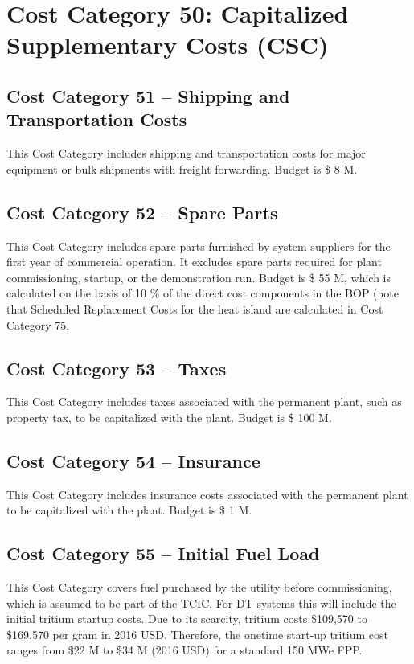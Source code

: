 \section{Cost Category 50: Capitalized Supplementary Costs (CSC)}


\subsection*{Cost Category 51 – Shipping and Transportation Costs}
This Cost Category includes shipping and transportation costs for major equipment or bulk shipments with freight forwarding. Budget is \$ 8 M.

\subsection*{Cost Category 52 – Spare Parts}
This Cost Category includes spare parts furnished by system suppliers for the first year of commercial operation. It excludes spare parts required for plant commissioning, startup, or the demonstration run.  Budget is \$ 55 M, which is calculated on the basis of 10 \% of the direct cost components in the BOP (note that Scheduled Replacement Costs for the heat island are calculated in Cost Category 75.

\subsection*{Cost Category 53 – Taxes}
This Cost Category includes taxes associated with the permanent plant, such as property tax, to be capitalized with the plant. Budget is \$ 100 M.

\subsection*{Cost Category 54 – Insurance}
This Cost Category includes insurance costs associated with the permanent plant to be capitalized with the plant.  Budget is \$ 1 M.

\subsection*{Cost Category 55 – Initial Fuel Load}
This Cost Category covers fuel purchased by the utility before commissioning, which is assumed to be part of the TCIC. For DT systems this will include the initial tritium startup costs.  Due to its scarcity, tritium costs \$109,570 to \$169,570 per gram in 2016 USD. Therefore, the onetime start-up tritium cost ranges from \$22 M to \$34 M (2016 USD) for a standard 150 MWe FPP. \\

